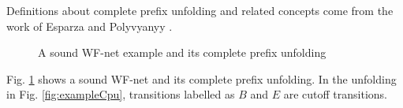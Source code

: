 \documentclass{llncs}
\begin{document}
Definitions about complete prefix unfolding and related concepts come from the work of Esparza \cite{esparza1996improvement} and Polyvyanyy \cite{polyvyanyy2010structuring}.

\begin{figure}[ht]
\centering
{}
\caption{A sound WF-net example and its complete prefix unfolding}
\label{fig:examplePetriAndCpu}
\end{figure}

\begin{example}\label{ex:petriAndCpu}
Fig. \ref{fig:examplePetriAndCpu} shows a sound WF-net and its complete prefix unfolding. In the unfolding in Fig. \ref{fig:exampleCpu}, transitions labelled as $B$ and $E$ are cutoff transitions.
\end{example}
\end{document}
